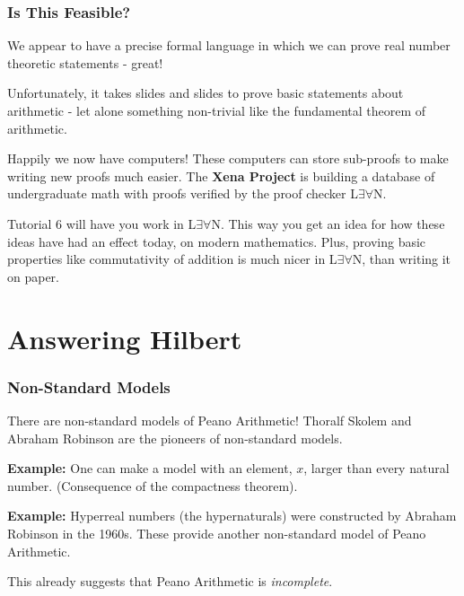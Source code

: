 \documentclass{beamer}
\begin{document}
\begin{frame}
	\frametitle{Is This Feasible?}
	
	
	We appear to have a precise formal language in which we can prove real number theoretic statements - great! 
	
	\vspace{0.2cm}
	
	Unfortunately, it takes slides and slides to prove basic statements about arithmetic - let alone something non-trivial like the fundamental theorem of arithmetic. 
	
	\vspace{0.7cm}
	
	Happily we now have computers! These computers can store sub-proofs to make writing new proofs much easier. The \textbf{Xena Project} is building a database of undergraduate math with proofs verified by the proof checker L$\exists \forall$N. 
	
	\vspace{0.2cm}
	
	Tutorial 6 will have you work in L$\exists\forall$N. This way you get an idea for how these ideas have had an effect today, on modern mathematics. Plus, proving basic properties like commutativity of addition is much nicer in L$\exists \forall$N, than writing it on paper. 
\end{frame}

\section{Answering Hilbert}

\begin{frame}
	\frametitle{Non-Standard Models}
	
	There are non-standard models of Peano Arithmetic! Thoralf Skolem and Abraham Robinson are the pioneers of non-standard models. 
	
	\vspace{0.5cm}
	
	{\bf Example:} One can make a model with an element, $x$, larger than every natural number. (Consequence of the compactness theorem).
	
	\vspace{0.5cm}
	
	{\bf Example:} Hyperreal numbers (the hypernaturals) were constructed by Abraham Robinson in the 1960s. These provide another non-standard model of Peano Arithmetic. 
	
	\vspace{0.5cm}
	
	This already suggests that Peano Arithmetic is \emph{incomplete}.
	
\end{frame}
\end{document}
